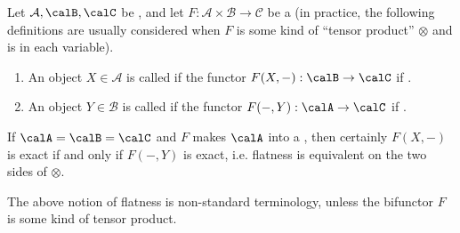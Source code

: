 \begin{definition} \label{definition:flat_object_in_an_abelian_category_with_respect_to_a_right_exact_monoidal_product_functor}
Let $\mathcal{A}, \calB, \calC$ be , and let $F : \mathcal{A} \times \mathcal{B} \to \mathcal{C}$ be a  (in practice, the following definitions are usually considered when $F$ is some kind of ``tensor product'' $\otimes$ and is  in each variable). 
\begin{enumerate}
    \item An object $X \in \mathcal{A}$ is called  if the functor $F(X, -): \calB \to \calC$ if .
    \item An object $Y \in \mathcal{B}$ is called  if the functor $F(-, Y): \calA \to \calC$ if .
\end{enumerate}
If $\calA = \calB = \calC$ and $F$ makes $\calA$ into a , then certainly $F(X,-)$ is exact if and only if $F(-,Y)$ is exact, i.e. flatness is equivalent on the two sides of $\otimes$.
\end{definition}
\begin{remark}
    The above notion of flatness is non-standard terminology, unless the bifunctor $F$ is some kind of tensor product.
\end{remark}